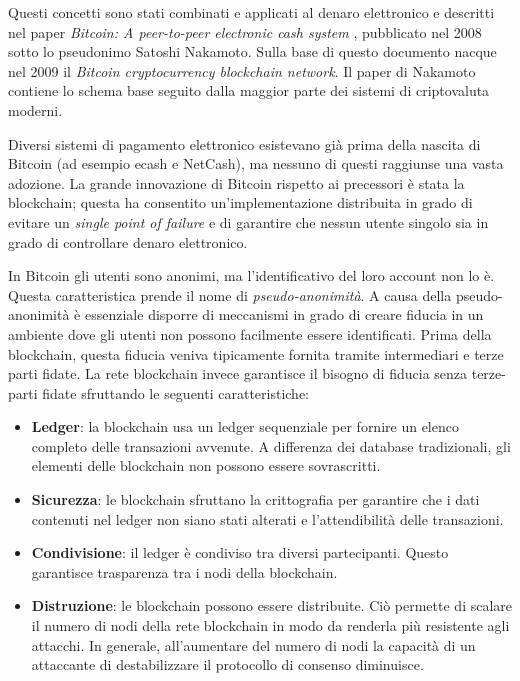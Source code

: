 Questi concetti sono stati combinati e applicati al denaro elettronico e
descritti nel paper \textit{Bitcoin: A peer-to-peer electronic cash system} \cite{nakamoto2008bitcoin}, pubblicato
nel 2008 sotto lo pseudonimo Satoshi Nakamoto. Sulla base di questo documento
nacque nel 2009 il \textit{Bitcoin cryptocurrency blockchain network}.
Il paper di Nakamoto contiene lo schema base
seguito dalla maggior parte dei sistemi di criptovaluta moderni.

Diversi sistemi di pagamento elettronico esistevano già prima della nascita di Bitcoin
(ad esempio ecash e NetCash), ma nessuno di questi raggiunse una vasta adozione.
La grande innovazione di Bitcoin rispetto ai precessori è stata la blockchain;
questa ha consentito un'implementazione distribuita in grado
di evitare un \textit{single point of failure} e di garantire che nessun utente singolo
sia in grado di controllare denaro elettronico.

In Bitcoin gli utenti sono anonimi, ma l'identificativo
del loro account non lo è. Questa caratteristica prende il nome di \textit{pseudo-anonimità}.
A causa della pseudo-anonimità è essenziale disporre di meccanismi in grado di creare
fiducia in un ambiente dove gli utenti non possono facilmente essere identificati. Prima
della blockchain, questa fiducia veniva tipicamente fornita tramite intermediari e terze parti fidate.
La rete blockchain invece garantisce il bisogno di fiducia senza terze-parti fidate sfruttando
le seguenti caratteristiche:
\begin{itemize}
	\item \textbf{Ledger}: la blockchain usa un ledger sequenziale per fornire un
	      elenco completo delle transazioni avvenute. A differenza dei database tradizionali,
	      gli elementi delle blockchain non possono essere sovrascritti.
	\item \textbf{Sicurezza}: le blockchain sfruttano la crittografia per garantire che i dati contenuti
	      nel ledger non siano stati alterati e l'attendibilità delle transazioni.
	\item \textbf{Condivisione}: il ledger è condiviso tra diversi partecipanti. Questo garantisce
	      trasparenza tra i nodi della blockchain.
	\item \textbf{Distruzione}: le blockchain possono essere distribuite. Ciò permette di scalare
	      il numero di nodi della rete blockchain in modo da renderla più resistente agli attacchi.
	      In generale, all'aumentare del numero di nodi la capacità di un attaccante di destabilizzare il
	      protocollo di consenso diminuisce.
\end{itemize}

